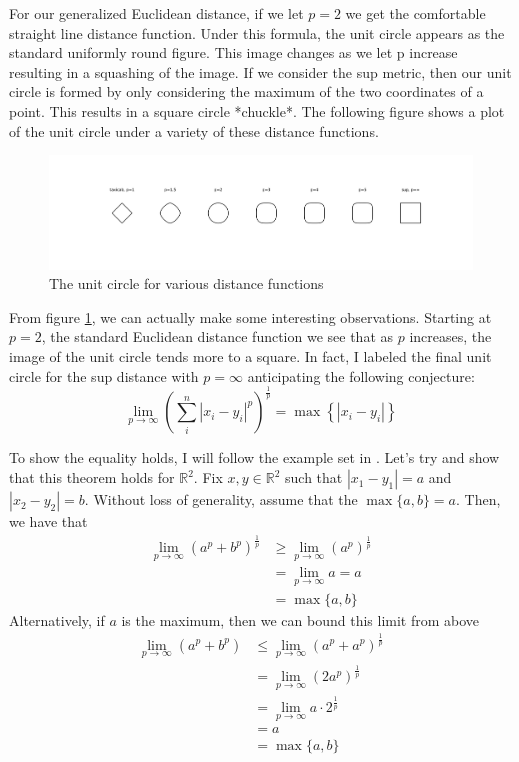 \documentclass[a4paper, 12pt]{article}
\newcommand{\R}{\mathbb{R}}
\begin{document}
For our generalized Euclidean distance, if we let $p=2$ we get the comfortable straight line distance function. Under this formula, the unit circle appears as the standard uniformly round figure. This image changes as we let p increase resulting in a squashing of the image. If we consider the sup metric, then our unit circle is formed by only considering the maximum of the two coordinates of a point. This results in a square circle *chuckle*. The following figure shows a plot of the unit circle under a variety of these distance functions.

\begin{figure}[!hbt]
  \hspace{-9em}
  \includegraphics[width=1.4\textwidth]{unitCircles}
  \caption{The unit circle for various distance functions}
  \label{fig:unitCircles}
\end{figure}

From figure \ref{fig:unitCircles}, we can actually make some interesting observations. Starting at $p=2$, the standard Euclidean distance function we see that as $p$ increases, the image of the unit circle tends more to a square. In fact, I labeled the final unit circle for the sup distance with $p=\infty$ anticipating the following conjecture:
  \begin{equation*}
    \lim_{p\to\infty}\left(\sum_i^n|x_i-y_i|^p\right)^{\frac{1}{p}} = \max\left\{|x_i-y_i|\right\}
  \end{equation*}

 To show the equality holds, I will follow the example set in \cite{online}. Let's try and show that this theorem holds for $\R^2$. Fix $x,y\in\R^2$ such that $|x_1-y_1|=a$ and $|x_2-y_2|=b$. Without loss of generality, assume that the $\max\{a,b\} =a$. Then, we have that
  \begin{align*}
    \lim_{p\to\infty}(a^p+b^p)^{\frac{1}{p}} &\geq \lim_{p\to\infty}(a^p)^{\frac{1}{p}}\\
    &= \lim_{p\to\infty}a = a \\
    &= \max\{a,b\}
  \end{align*}
  Alternatively, if $a$ is the maximum, then we can bound this limit from above
  \begin{align*}
    \lim_{p\to\infty}(a^p+b^p) &\leq \lim_{p\to\infty}(a^p+a^p)^{\frac{1}{p}} \\
    &= \lim_{p\to\infty} (2a^p)^{\frac{1}{p}} \\
    &= \lim_{p\to\infty} a\cdot 2^{\frac{1}{p}}\\
    &= a \\
    &= \max\{a,b\}
  \end{align*}
\end{document}
